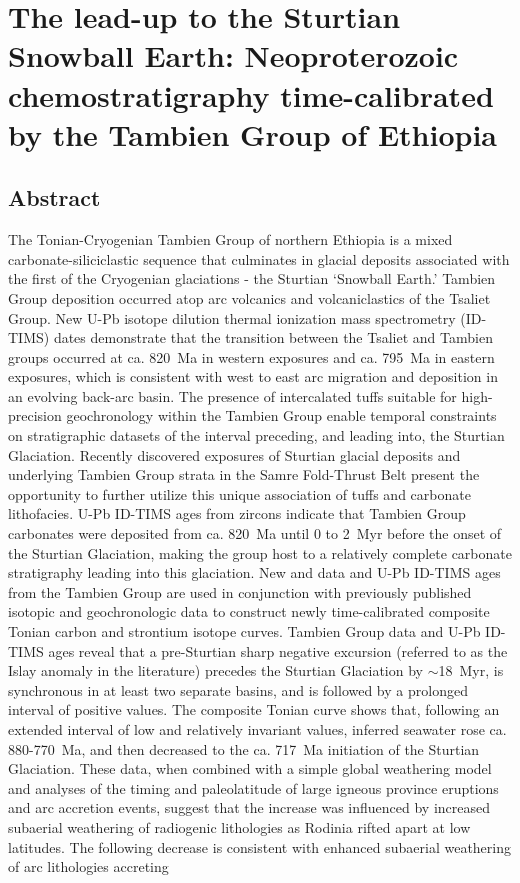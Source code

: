 \chapter[The lead-up to the Sturtian Snowball Earth: Neoproterozoic chemostratigraphy time-calibrated by the Tambien Group of Ethiopia][Tambien Group]{The lead-up to the Sturtian Snowball Earth: Neoproterozoic chemostratigraphy time-calibrated by the Tambien Group of Ethiopia}

\section{Abstract}

The Tonian-Cryogenian Tambien Group of northern Ethiopia is a mixed carbonate-siliciclastic sequence that culminates in glacial deposits associated with the first of the Cryogenian glaciations - the Sturtian `Snowball Earth.' Tambien Group deposition occurred atop arc volcanics and volcaniclastics of the Tsaliet Group. New U-Pb isotope dilution thermal ionization mass spectrometry (ID-TIMS) dates demonstrate that the transition between the Tsaliet and Tambien groups occurred at ca. 820~Ma in western exposures and ca. 795~Ma in eastern exposures, which is consistent with west to east arc migration and deposition in an evolving back-arc basin. The presence of intercalated tuffs suitable for high-precision geochronology within the Tambien Group enable temporal constraints on stratigraphic datasets of the interval preceding, and leading into, the Sturtian Glaciation. Recently discovered exposures of Sturtian glacial deposits and underlying Tambien Group strata in the Samre Fold-Thrust Belt present the opportunity to further utilize this unique association of tuffs and carbonate lithofacies. U-Pb ID-TIMS ages from zircons indicate that Tambien Group carbonates were deposited from ca. 820~Ma until 0 to 2~Myr before the onset of the Sturtian Glaciation, making the group host to a relatively complete carbonate stratigraphy leading into this glaciation. New \dC and \SrSr data and U-Pb ID-TIMS ages from the Tambien Group are used in conjunction with previously published isotopic and geochronologic data to construct newly time-calibrated composite Tonian carbon and strontium isotope curves. Tambien Group \dC data and U-Pb ID-TIMS ages reveal that a pre-Sturtian sharp negative \dC excursion (referred to as the Islay anomaly in the literature) precedes the Sturtian Glaciation by $\sim$18~Myr, is synchronous in at least two separate basins, and is followed by a prolonged interval of positive \dC values. The composite Tonian \SrSr curve shows that, following an extended interval of low and relatively invariant values, inferred seawater \SrSr rose ca. 880-770~Ma, and then decreased to the ca. 717~Ma initiation of the Sturtian Glaciation. These data, when combined with a simple global weathering model and analyses of the timing and paleolatitude of large igneous province eruptions and arc accretion events, suggest that the \SrSr increase was influenced by increased subaerial weathering of radiogenic lithologies as Rodinia rifted apart at low latitudes. The following \SrSr decrease is consistent with enhanced subaerial weathering of arc lithologies accreting 